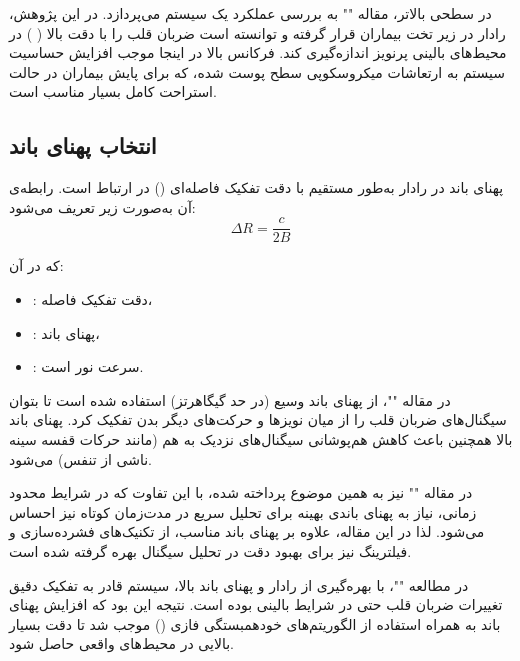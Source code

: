 در سطحی بالاتر، مقاله "" به بررسی عملکرد یک سیستم  می‌پردازد. در این پژوهش، رادار در زیر تخت بیماران  قرار گرفته و توانسته است ضربان قلب را با دقت بالا ( ) در محیط‌های بالینی پرنویز اندازه‌گیری کند. فرکانس بالا در اینجا موجب افزایش حساسیت سیستم به ارتعاشات میکروسکوپی سطح پوست شده، که برای پایش بیماران در حالت استراحت کامل بسیار مناسب است.

\subsection{انتخاب پهنای باند} %
\label{sec:bandwidth-selection}

پهنای باند در رادار  به‌طور مستقیم با دقت تفکیک فاصله‌ای () در ارتباط است. رابطه‌ی آن به‌صورت زیر تعریف می‌شود:
\[
\Delta R = \frac{c}{2B}
\]
\label{eq:range_resolution_fmcw} %

که در آن:
\begin{itemize}
    \item \textbf{}: دقت تفکیک فاصله،
    \item \textbf{}: پهنای باند،
    \item \textbf{}: سرعت نور است.
\end{itemize}

در مقاله ""، از پهنای باند وسیع (در حد گیگاهرتز) استفاده شده است تا بتوان سیگنال‌های ضربان قلب را از میان نویزها و حرکت‌های دیگر بدن تفکیک کرد. پهنای باند بالا همچنین باعث کاهش هم‌پوشانی سیگنال‌های نزدیک به هم (مانند حرکات قفسه سینه ناشی از تنفس) می‌شود.

در مقاله "" نیز به همین موضوع پرداخته شده، با این تفاوت که در شرایط محدود زمانی، نیاز به پهنای باندی بهینه برای تحلیل سریع در مدت‌زمان کوتاه نیز احساس می‌شود. لذا در این مقاله، علاوه بر پهنای باند مناسب، از تکنیک‌های فشرده‌سازی و فیلترینگ نیز برای بهبود دقت در تحلیل سیگنال بهره گرفته شده است.

در مطالعه ""، با بهره‌گیری از رادار  و پهنای باند بالا، سیستم قادر به تفکیک دقیق تغییرات ضربان قلب حتی در شرایط بالینی بوده است. نتیجه این بود که افزایش پهنای باند به همراه استفاده از الگوریتم‌های خودهمبستگی فازی () موجب شد تا دقت بسیار بالایی در محیط‌های واقعی حاصل شود.

